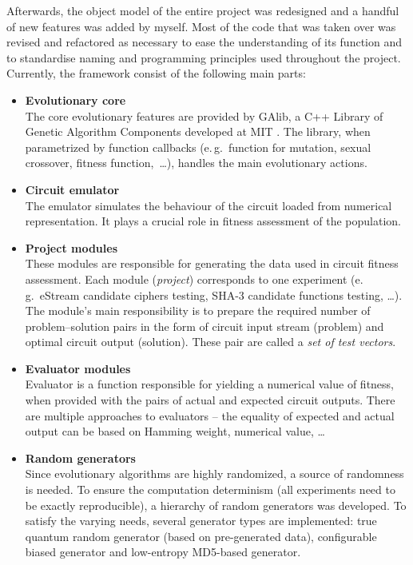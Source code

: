 \documentclass[12pt,oneside]{fithesis2}		%
\renewcommand{\_}{\leavevmode \kern0.0em\vbox{\hrule width0.4em}}
\newcommand{\squarebullet}{\textcolor{black}{\raisebox{0.15em}{\rule{4pt}{4pt}}}}
\newenvironment{myItemize}{
  \begin{itemize}[leftmargin=2em,rightmargin=1em,itemsep=\parskip ,parsep=0em,topsep=0em,partopsep=0em]
  \renewcommand{\labelitemi}{\squarebullet}
  \renewcommand{\labelitemii}{$\diamond$}
}{
  \end{itemize}
}
\begin{document}
Afterwards, the object model of the entire project was redesigned and a handful of new features was added by myself. 
Most of the code that was taken over was revised and refactored as necessary
to ease the understanding of its function and to standardise naming and programming principles used throughout the project. 
Currently, the framework consist of the following main parts:
\begin{myItemize}
\item \textbf{Evolutionary core}\\
The core evolutionary features are provided by GAlib, a C++ Library of Genetic Algorithm Components developed at MIT \parencite{galib}.
The library, when parametrized by function callbacks (e.\,g.\ function for mutation, sexual crossover, fitness function,~\dots),
handles the main evolutionary actions.
\item \textbf{Circuit emulator}\\
The emulator simulates the behaviour of the circuit loaded from numerical representation. It plays a crucial role in
fitness assessment of the population.
\item \textbf{Project modules}\\
These modules are responsible for generating the data used in circuit fitness assessment. Each module (\textit{project}) corresponds
to one experiment (e.\,g.\ eStream candidate ciphers testing, SHA-3 candidate functions testing, \dots). The module's main
responsibility is to prepare the required number of problem--solution pairs in the form of circuit input stream (problem)
and optimal circuit output (solution). These pair are called a \textit{set of test vectors}.
\item \textbf{Evaluator modules}\\
Evaluator is a function responsible for yielding a numerical value of fitness, when provided with the pairs of
actual and expected circuit outputs. There are multiple approaches to evaluators -- the equality of expected and
actual output can be based on Hamming weight, numerical value, \dots
\item \textbf{Random generators}\\
Since evolutionary algorithms are highly randomized, a source of randomness is needed. To ensure the
computation determinism (all experiments need to be exactly reproducible), a hierarchy of random generators was developed.
To satisfy the varying needs, several generator types are implemented: true quantum random generator (based on pre-generated data),
configurable biased generator and low-entropy MD5-based generator.

\end{myItemize}
\end{document}
